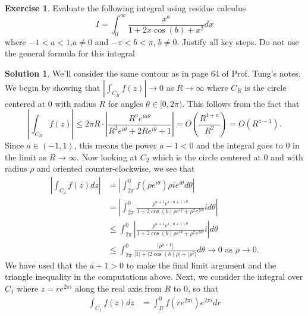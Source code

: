 \documentclass[12pt]{article}
\newcommand{\abs}[1]{ \left| #1 \right| }
\theoremstyle{definition}
\newtheorem{exer}{Exercise}
\newtheorem{sol}{Solution}
\theoremstyle{remark}
\begin{document}
\newpage

\begin{exer}
    Evaluate the following integral using residue calculus
    \begin{equation}
        I = \int_{0}^{\infty} \frac{x^a}{1 + 2x\cos(b) + x^2}dx 
    \end{equation}
where $-1<a<1$,$a\neq 0$ and $-\pi < b < \pi$, $b\neq 0$. Justify all key steps. Do not use the general formula for this integral
\end{exer}

\begin{sol}
    We'll consider the same contour as in page 64 of Prof. Tung's notes. We begin by showing that $\abs{\int_{C_R} f(z)} \to 0$ as $R\to \infty$ where $C_R$ is the circle centered at 0 with radius $R$ for angles $\theta\in[0,2\pi)$. This follows from the fact that
    \begin{equation}
        \abs{\int_{C_R} f(z)} \leq 2\pi R \cdot \abs{ \frac{R^a e^{ia\theta}}{R^2e^{i\theta} + 2R e^{i\theta} + 1} } = O \left( \frac{R^{1+a}}{R^2} \right) = O(R^{a-1}).
    \end{equation}
    Since $a\in (-1, 1)$, this means the power $a-1<0$ and the integral goes to 0 in the limit as $R\to\infty$. Now looking at $C_2$ which is the circle centered at 0 and with radius $\rho$ and oriented counter-clockwise, we see that 
    \begin{align}
        \abs{\int_{C_2} f(z) dz} &= \abs{\int_{2\pi}^{0} f(\rho e^{i\theta}) \rho i e^{i\theta} d\theta} \\
                                 &= \abs{\int_{2\pi}^{0} \frac{\rho^{a+1} e^{i (a+1) \theta}}{1 + 2\cos(b)\rho e^{i\theta} + \rho^2 e^{2i\theta}} i d\theta }\\
                                 &\leq \int_{2\pi}^{0} \abs{ \frac{\rho^{a+1} e^{i (a+1) \theta}}{1 + 2\cos(b)\rho e^{i\theta} + \rho^2 e^{2i\theta}} i  } d\theta\\
                                 &\leq \int_{2\pi}^{0} \frac{\abs{\rho^{a+1}}}{\abs{1} + \abs{2\cos(b)\rho} +\abs{\rho^{2}}} d\theta \to 0 \text{ as } \rho \to 0.
    \end{align}
    We have used that the $a+1>0$ to make the final limit argument and the triangle inequality in the computations above. Next, we consider the integral over $C_1$ where $z = re^{2\pi i}$ along the real axis from $R$ to 0, so that
    \begin{align}
        \int_{C_1} f(z) dz &= \int_{R}^{0} f(re^{2\pi i}) e^{2\pi i} dr\\

\end{align}
\end{sol}
\end{document}
